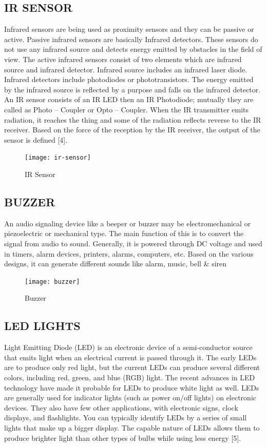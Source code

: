 \documentclass[conference]{IEEEtran}
\begin{document}
    \subsection{IR SENSOR}
    Infrared sensors are being used as proximity sensors and
    they can be passive or active. Passive infrared sensors are
    basically Infrared detectors. These sensors do not use any
    infrared source and detects energy emitted by obstacles in
    the field of view. The active infrared sensors consist of two
    elements which are infrared source and infrared detector.
    Infrared source includes an infrared laser diode. Infrared
    detectors include photodiodes or phototransistors. The
    energy emitted by the infrared source is reflected by a
    purpose and falls on the infrared detector. An IR sensor
    consists of an IR LED then an IR Photodiode; mutually they
    are called as Photo – Coupler or Opto – Coupler. When the IR
    transmitter emits radiation, it reaches the thing and some of
    the radiation reflects reverse to the IR receiver. Based on the
    force of the reception by the IR receiver, the output of the
    sensor is defined [4].

    \begin{figure}[htbp]
        \centerline{\texttt{[image: ir-sensor]}}
        \caption{IR Sensor}
        \label{fig}
    \end{figure}

    \subsection{BUZZER}
    An audio signaling device like a beeper or buzzer may be electromechanical or piezoelectric or mechanical type. The main function of this is to convert the signal from audio to sound. Generally, it is powered through DC voltage and used in timers, alarm devices, printers, alarms, computers, etc. Based on the various designs, it can generate different sounds like alarm, music, bell & siren
    \begin{figure}[htbp]
        \centerline{\texttt{[image: buzzer]}}
        \caption{Buzzer}
        \label{fig}
    \end{figure}


    \subsection{LED LIGHTS}
    \paragraphA Light Emitting Diode (LED) is an electronic device of a
    semi-conductor source that emits light when an electrical
    current is passed through it. The early LEDs are to produce
    only red light, but the current LEDs can produce several
    different colors, including red, green, and blue (RGB) light.
    The recent advances in LED technology have made it
    probable for LEDs to produce white light as well. LEDs are
    generally used for indicator lights (such as power on/off
    lights) on electronic devices. They also have few other
    applications, with electronic signs, clock displays, and
    flashlights. You can typically identify LEDs by a series of small lights that make up a bigger display. The capable
    nature of LEDs allows them to produce brighter light than
    other types of bulbs while using less energy [5].
\end{document}
